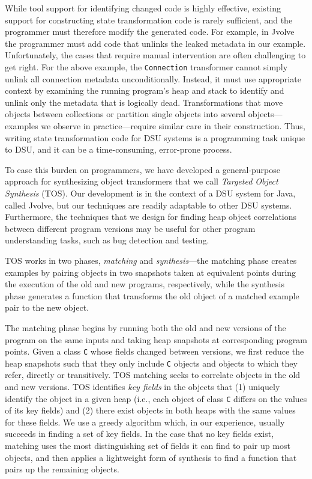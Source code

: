 \documentclass[natbib,10pt]{sigplanconf}
\newcommand{\code}[1]{\lstinline|#1|\xspace}
\newcommand{\TOS}{TOS\xspace}
\begin{document}
While tool support for identifying changed code is highly effective,
existing support for constructing state transformation code is rarely
sufficient, and the programmer must therefore modify the generated code.  
For example, in Jvolve the programmer must  add code that
unlinks the leaked metadata in our example.  Unfortunately, the cases
that require manual intervention are often challenging to get right.
For the above example, the \code{Connection} transformer cannot simply unlink all
connection metadata unconditionally. Instead, it must use appropriate
context by examining the running program's heap and stack to
identify and unlink only the metadata that is logically dead.
Transformations that move objects between collections or
partition single objects into several objects---examples we 
observe in practice---require similar care in their construction.
Thus, writing state transformation code for DSU systems is a  programming task unique to DSU, and it can be
a time-consuming, error-prone process.

To ease this burden on programmers, we have developed a 
general-purpose approach for synthesizing object
transformers that we call \emph{Targeted Object Synthesis} (\TOS).
Our development is in the context of a DSU system for
Java, called Jvolve, but our techniques are readily adaptable to other
DSU systems. Furthermore, the
techniques that we design for finding heap object correlations between
different program versions may be useful for other program
understanding tasks, such as bug detection and testing.


\TOS works in two phases, \emph{matching} and \emph{synthesis}---the
matching phase creates examples by pairing objects in two snapshots taken at equivalent points during
the execution of the old and new programs, respectively, while the
synthesis phase generates a function that transforms the old object of
a matched example pair to the new object.

The matching phase begins by running both the old and new versions of the
program on the same inputs and taking heap snapshots at corresponding
program points.  Given a class \code{C} whose fields changed
between versions, we first reduce the heap snapshots such that they
only include \code{C} objects and objects to which they refer,
directly or transitively. \TOS matching seeks to correlate
objects in the old and new versions. \TOS identifies \emph{key fields}
in the objects that (1) uniquely identify the object in a given heap
(i.e., each object of class \code{C} differs on the values of its key
fields) and (2) there exist objects in both heaps with the same values
for these fields.  We use a greedy algorithm which, in our experience,
usually succeeds in finding a set of key fields.  In the case that
no key fields exist, matching uses the most distinguishing set of
fields it can find to pair up most objects, and then applies a
lightweight form of synthesis to find a function that
pairs up the remaining objects.
\end{document}
